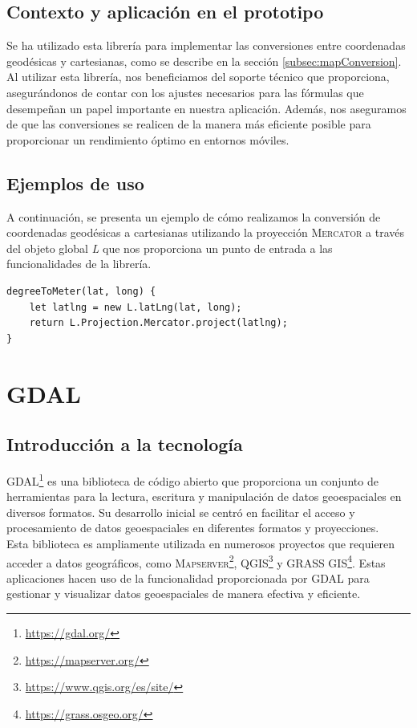 \documentclass[a4paper, 11pt]{book}
\begin{document}
\subsection{Contexto y aplicación en el prototipo}
Se ha utilizado esta librería para implementar las conversiones entre coordenadas geodésicas y cartesianas, como se describe en la sección \ref{subsec:mapConversion}. Al utilizar esta librería, nos beneficiamos del soporte técnico que proporciona, asegurándonos de contar con los ajustes necesarios para las fórmulas que desempeñan un papel importante en nuestra aplicación. Además, nos aseguramos de que las conversiones se realicen de la manera más eficiente posible para proporcionar un rendimiento óptimo en entornos móviles.
\subsection{Ejemplos de uso}
A continuación, se presenta un ejemplo de cómo realizamos la conversión de coordenadas geodésicas a cartesianas utilizando la proyección \textsc{Mercator} a través del objeto global \emph{L} que nos proporciona un punto de entrada a las funcionalidades de la librería.
\begin{verbatim}
degreeToMeter(lat, long) {
    let latlng = new L.latLng(lat, long);
    return L.Projection.Mercator.project(latlng);
}
\end{verbatim}
\section{GDAL}
\subsection{Introducción a la tecnología}
\textsc{GDAL}\footnote{\url{https://gdal.org/}} es una biblioteca de código abierto que proporciona un conjunto de herramientas para la lectura, escritura y manipulación de datos geoespaciales en diversos formatos. Su desarrollo inicial se centró en facilitar el acceso y procesamiento de datos geoespaciales en diferentes formatos y proyecciones.\\
Esta biblioteca es ampliamente utilizada en numerosos proyectos que requieren acceder a datos geográficos, como \textsc{Mapserver}\footnote{\url{https://mapserver.org/}}, \textsc{QGIS}\footnote{\url{https://www.qgis.org/es/site/}} y \textsc{GRASS GIS}\footnote{\url{https://grass.osgeo.org/}}. Estas aplicaciones hacen uso de la funcionalidad proporcionada por \textsc{GDAL} para gestionar y visualizar datos geoespaciales de manera efectiva y eficiente.
\end{document}
